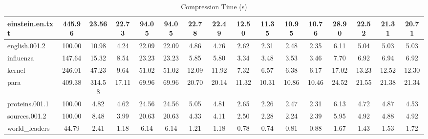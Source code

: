 \begin{table}[]
\begin{tabular}{|l|c|c|c|c|c|c|c|c|c|c|c|c|c|c|c|}
\hline
einstein.en.txt & 445.96 & 23.56 & 22.73 & 94.05 & 94.05 & 22.78 & 22.49 & 12.50 & 11.35 & 10.95 & 10.76 & 28.90 & 22.52 & 21.31 & 20.71 \\
\hline
english.001.2 & 100.00 & 10.98 & 4.24 & 22.09 & 22.09 & 4.86 & 4.76 & 2.62 & 2.31 & 2.48 & 2.35 & 6.11 & 5.04 & 5.03 & 5.03 \\
\hline
influenza & 147.64 & 15.32 & 8.54 & 23.23 & 23.23 & 5.85 & 5.80 & 3.34 & 3.48 & 3.53 & 3.46 & 7.70 & 6.92 & 6.94 & 6.92 \\
\hline
kernel & 246.01 & 47.23 & 9.64 & 51.02 & 51.02 & 12.09 & 11.92 & 7.32 & 6.57 & 6.38 & 6.17 & 17.02 & 13.23 & 12.52 & 12.30 \\
\hline
para & 409.38 & 314.58 & 17.11 & 69.96 & 69.96 & 20.70 & 20.14 & 11.32 & 10.31 & 10.86 & 10.46 & 24.52 & 21.55 & 21.38 & 21.34 \\
\hline
proteins.001.1 & 100.00 & 4.82 & 4.62 & 24.56 & 24.56 & 5.05 & 4.81 & 2.65 & 2.26 & 2.47 & 2.31 & 6.13 & 4.72 & 4.87 & 4.53 \\
\hline
sources.001.2 & 100.00 & 8.48 & 3.99 & 20.63 & 20.63 & 4.33 & 4.11 & 2.50 & 2.28 & 2.24 & 2.39 & 5.95 & 4.92 & 4.88 & 4.92 \\
\hline
world\_leaders & 44.79 & 2.41 & 1.18 & 6.14 & 6.14 & 1.21 & 1.18 & 0.78 & 0.74 & 0.81 & 0.88 & 1.67 & 1.43 & 1.53 & 1.72 \\
\hline
\end{tabular}
\caption{Compression Time (s)}
\label{tab:compression_time}
\end{table}
